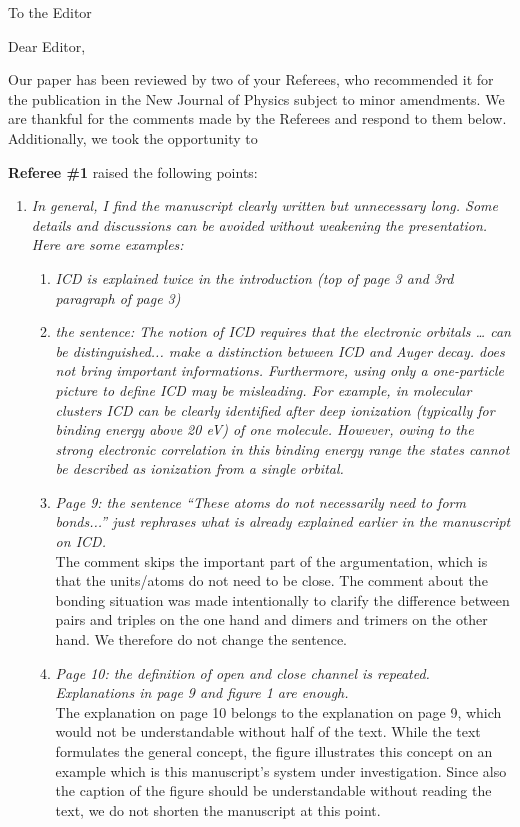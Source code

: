 \documentclass[DIN,pagenumber=false,parskip=half,fromalign=left,fromphone=true,fromemail=true,fromurl=false,fromlogo=false,fromrule=false]{scrlttr2}
\begin{document}
\begin{letter}{To the Editor}
	
	\opening{Dear Editor,}


Our paper has been reviewed by two of your Referees,
who recommended it for the publication in the
New Journal of Physics subject to minor amendments.
We are thankful for the comments made by the Referees and
respond to them below. Additionally, we took the opportunity to
{\color{blue}{correct some typos or whatever.}}

\textbf{Referee \#1} raised the following points:

\begin{enumerate}
 \item \emph{In general, I find the manuscript clearly written but unnecessary long. Some details and discussions can be avoided without weakening the presentation. Here are some examples:}
  \begin{enumerate}
   \item \emph{ICD is explained twice in the introduction (top of page 3 and
         3rd paragraph of page 3)}\\
   \item \emph{the sentence: The notion of ICD requires that the electronic orbitals … can be distinguished... make a distinction between ICD and Auger decay. does not bring important informations. Furthermore, using only a one-particle picture to define ICD may be misleading. For example, in molecular clusters ICD can be clearly identified after deep ionization (typically for binding energy above 20 eV) of one molecule. However, owing to the strong electronic correlation in this binding energy range the states cannot be described as ionization from a single orbital.}\\
   \item \emph{Page 9: the sentence “These atoms do not necessarily need to form bonds...” just rephrases what is already explained earlier in the manuscript on ICD.}\vspace{0.3cm}\\
         The comment skips the important part of the argumentation, which is
         that the units/atoms do not need to be close. The comment about the
         bonding situation was made intentionally to clarify the difference
         between pairs and triples on the one hand and dimers and trimers on
         the other hand. We therefore do not change the sentence.

   \item \emph{Page 10: the definition of open and close channel is repeated. Explanations in page 9 and figure 1 are enough.}\vspace{0.3cm}\\
         The explanation on page 10 belongs to the explanation on page 9, which
         would not be understandable without half of the text. While the
         text formulates the general concept, the figure illustrates this concept
         on an example which is this manuscript's system under investigation.
         Since also the caption of the figure should be understandable without
         reading the text, we do not shorten the manuscript at this point.


\end{enumerate}
\end{enumerate}
\end{letter}
\end{document}
